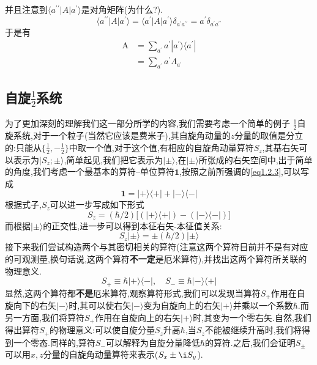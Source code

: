 \documentclass[lang=cn,newtx,10pt,scheme=chinese,thmcnt=section]{elegantbook}
\begin{document}
并且注意到$\langle a^{\prime\prime}| A| a^{\prime}\rangle $是对角矩阵(为什么?).
\begin{equation}
	\langle a^{\prime\prime}|A|a^{\prime}\rangle=\langle a^{\prime}|A|a^{\prime}\rangle\delta_{a^{\prime}a^{\prime\prime}}=a^{\prime}\delta_{a^{\prime}a^{\prime\prime}}
\end{equation}
于是有
\begin{equation}\label{eq1.2.4}
\begin{aligned}\text{A}&= \sum_{a^{\prime}}a^{\prime}| a^{\prime}\rangle\langle a^{\prime}|\\&= \sum_{a^{\prime}}a^{\prime}\Lambda_{a^{\prime}}\end{aligned}
\end{equation}
\subsection*{自旋$\frac12$系统}
为了更加深刻的理解我们这一部分所学的内容,我们需要考虑一个简单的例子  $\frac12$自旋系统,对于一个粒子(当然它应该是费米子),其自旋角动量的$z$分量的取值是分立的:只能从$\{\frac12,-\frac12\}$中取一个值,对于这个值,有相应的自旋角动量算符$S_z$,其基右矢可以表示为$| S_{z};\pm\rangle $,简单起见,我们把它表示为$|\pm\rangle $,在$|\pm\rangle $所张成的右矢空间中,出于简单的角度,我们考虑一个最基本的算符--单位算符$\mathbf{1}$,按照之前所强调的\ref{eq1.2.3},可以写成
\begin{equation}
	\mathbf{1}=|+\rangle\langle+|+|-\rangle\langle-|
\end{equation}
根据式子\label{1.2.4},$S_z$可以进一步写成如下形式
\begin{equation}
	S_{z}=(\hbar/2)\Big[(|+\rangle\langle+|)-(|-\rangle\langle-|)\Big]
\end{equation}
而根据$|\pm\rangle$的正交性,进一步可以得到本征右矢-本征值关系:
\begin{equation}
	S_{z}|\pm\rangle=\pm(\hbar/2)|\pm\rangle 
\end{equation}
接下来我们尝试构造两个与其密切相关的算符(注意这两个算符目前并不是有对应的可观测量,换句话说,这两个算符\textbf{不一定}是厄米算符),并找出这两个算符所关联的物理意义.
\begin{equation}
	S_+\equiv\hbar|+\rangle\langle-| ,\quad S_-\equiv\hbar|-\rangle\langle+|
\end{equation}
显然,这两个算符都\textbf{不是}厄米算符,观察算符形式,我们可以发现当算符$S_+$作用在自旋向下的右矢$|-\rangle$时,其可以使右矢$|-\rangle$变为自旋向上的右矢$|+\rangle$并乘以一个系数$\hbar$.而另一方面,我们将算符$S_+$作用在自旋向上的右矢$|+\rangle$时,其变为一个零右矢.自然,我们得出算符$S_+$的物理意义:可以使自旋分量$S_z$升高$\hbar$,当$S_z$不能被继续升高时,我们将得到一个零态.同样的,算符$S_-$可以解释为自旋分量降低$\hbar$的算符.之后,我们会证明$S_\pm$可以用$x,z$分量的自旋角动量算符来表示($S_x\pm\i S_y$).
\end{document}
